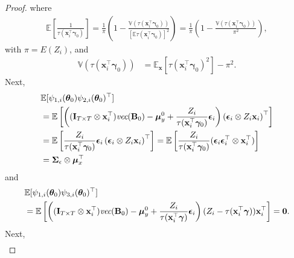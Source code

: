 \documentclass[12pt, A4]{article}
\newcommand{\ObsCov}{\textbf{x}_i}
\newcommand{\LogCoe}{\boldsymbol{\gamma}}
\newcommand{\vect}{\emph{vec}}
\newcommand{\IdenMat}{\textbf{I}}
\begin{document}
\begin{proof}
        where 
            \begin{align*}
                \mathbb{E}\left[ \frac{1}{\tau(\ObsCov^{\top}\LogCoe_0)} \right] = \frac{1}{\pi}\left( 1 - \frac{\mathbb{V}(\tau(\ObsCov^{\top}\LogCoe_0))}{ [\mathbb{E}\tau(\ObsCov^{\top}\LogCoe_0)]^2 } \right) = \frac{1}{\pi} \left(1 - \frac{\mathbb{V}(\tau(\ObsCov^{\top}\LogCoe_0))}{\pi^2} \right),
            \end{align*}
            with $\pi=E(Z_i)$,
            and
            \begin{align*}
                \mathbb{V}(\tau(\ObsCov^{\top}\LogCoe_0)) &= \mathbb{E}_{\textbf{x}}[ \tau(\ObsCov^{\top}\LogCoe_0)^2 ] - \pi^2.
            \end{align*}
        Next,        
            \begin{align*}
                &
                \mathbb{E} [ \psi_{1,i}(\boldsymbol{\theta}_0) \psi_{2,i}(\boldsymbol{\theta}_0)^{\top} ] \\
                &= \mathbb{E} \left[ \left( (\IdenMat_{T \times T} \otimes \ObsCov^{\top})\vect(\textbf{B}_0) - \boldsymbol{\mu}_y^0 + \frac{Z_i}{\tau(\ObsCov^{\top}\LogCoe_0)}\boldsymbol{\epsilon}_i \right) \left( \boldsymbol{\epsilon}_i \otimes Z_i \ObsCov \right)^{\top} \right] \\
                &= \mathbb{E} \left[ \frac{Z_i}{\tau(\ObsCov^{\top}\LogCoe_0)} \boldsymbol{\epsilon}_i  \left( \boldsymbol{\epsilon}_i \otimes Z_i \ObsCov \right)^{\top} \right] 
                = \mathbb{E} \left[ \frac{Z_i}{\tau(\ObsCov^{\top}\LogCoe_0)}  ( \boldsymbol{\epsilon}_i \boldsymbol{\epsilon}_i^{\top} \otimes \ObsCov^{\top} ) \right] \\
                &= \boldsymbol{\Sigma}_{\epsilon} \otimes\boldsymbol{\mu}_x^{\top}
            \end{align*}
        and 
            \begin{align*}
                &\mathbb{E} [ \psi_{1,i}(\boldsymbol{\theta}_0) \psi_{3,i}(\boldsymbol{\theta}_0)^{\top} ] \\
                &= \mathbb{E} \left[ \left( (\IdenMat_{T \times T} \otimes \ObsCov^{\top})\vect(\textbf{B}_0) - \boldsymbol{\mu}_y^0 + \frac{Z_i}{\tau(\ObsCov^{\top}\LogCoe)}\boldsymbol{\epsilon}_i \right) (Z_i - \tau(\ObsCov^{\top}\LogCoe)) \ObsCov^{\top} \right]
                = \textbf{0}. \\
            \end{align*}
        Next,
            \begin{align*}
                &

\end{align*}
\end{proof}
\end{document}
